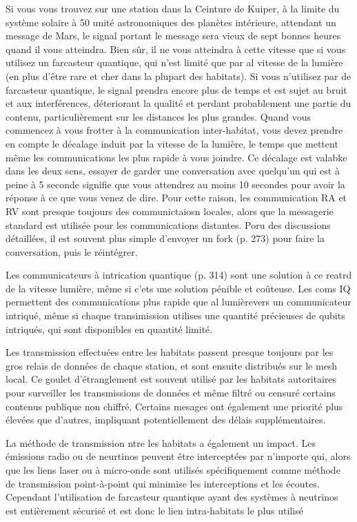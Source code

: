 Si vous vous trouvez sur une station dans la Ceinture de Kuiper, à la limite du système solaire à 50 unité astronomiques des planètes intérieure, attendant un message de Mars, le signal portant le message sera vieux de sept bonnes heures quand il vous atteindra. Bien sûr, il ne vous atteindra à cette vitesse que si vous utilisez un farcasteur quantique, qui n'est limité que par al vitesse de la lumière (en plus d'être rare et cher dans la plupart des habitats). Si vous n'utilisez par de farcasteur quantique, le signal prendra encore plus de temps et est sujet au bruit et aux interférences, déteriorant la qualité et perdant probablement une partie du contenu, particulièrement sur les distances les plus grandes. Quand vous commencez à vous frotter à la communication inter-habitat, vous devez prendre en compte le décalage induit par la vitesse de la lumière, le temps que mettent même les communications les plus rapide à vous joindre. Ce décalage est valabke dans les deux sens, essayer de garder une conversation avec quelqu'un qui est à peine à 5 seconde signifie que vous attendrez au moins 10 secondes pour avoir la réponse à ce que vous venez de dire. Pour cette raison, les communication RA et RV sont presque toujours des communictaiosn locales, alors que la messagerie standard est utilisée pour les communications distantes. Poru des discussions détaillées, il est souvent plus simple d'envoyer un fork (p. 273) pour faire la conversation, puis le réintégrer. 

Les communicateurs à intrication quantique (p. 314) sont une solution à ce reatrd de la vitesse lumière, même si c'ets une solution pénible et coûteuse. Les coms IQ permettent des communications plus rapide que al lumièrevers un communicateur intriqué, même si chaque transimission utilises une quantité précieuses de qubits intriqués, qui sont disponibles en quantité limité. 

Les transmission effectuées entre les habitats passent presque toujours par les gros relais de données de chaque station, et sont ensuite distribués sur le mesh local. Ce goulet d'étranglement est souvent utilisé par les habitats autoritaires pour surveiller les transmissions de données et même filtré ou censuré certains contenus publique non chiffré. Certains mesages ont également une priorité plus élevées que d'autres, impliquant potentiellement des délais supplémentaires. 



La méthode de transmission ntre les habitats a également un impact. Les émissions radio ou de neurtinos peuvent être interceptées par n'importe qui, alors que les liens laser ou à micro-onde sont utilisés spécifiquement comme méthode de transmission point-à-point qui minimise les interceptions et les écoutes. Cependant l'utilisation de farcasteur quantique ayant des systèmes à neutrinos est entièrement sécurisé et est donc le lien intra-habitats le plus utilisé 

